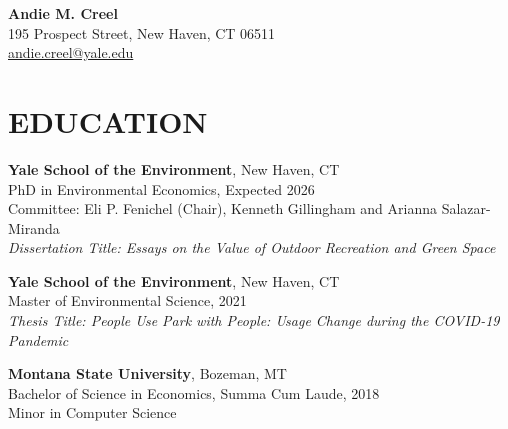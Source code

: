\documentclass[11pt]{article}
\begin{document}
\begin{center}
    \textbf{\Huge Andie M. Creel} \\
    195 Prospect Street, New Haven, CT 06511 \\
    \href{mailto:andie.creel@yale.edu}{andie.creel@yale.edu}
\end{center}

\section*{EDUCATION}
\textbf{Yale School of the Environment}, New Haven, CT \\
PhD in Environmental Economics, Expected 2026 \\
Committee: Eli P. Fenichel (Chair), Kenneth Gillingham and Arianna Salazar-Miranda \\
\textit{Dissertation Title: Essays on the Value of Outdoor Recreation and Green Space}

\textbf{Yale School of the Environment}, New Haven, CT \\
Master of Environmental Science, 2021 \\
\textit{Thesis Title: People Use Park with People: Usage Change during the COVID-19 Pandemic}

\textbf{Montana State University}, Bozeman, MT \\
Bachelor of Science in Economics, Summa Cum Laude, 2018 \\
Minor in Computer Science
\end{document}
